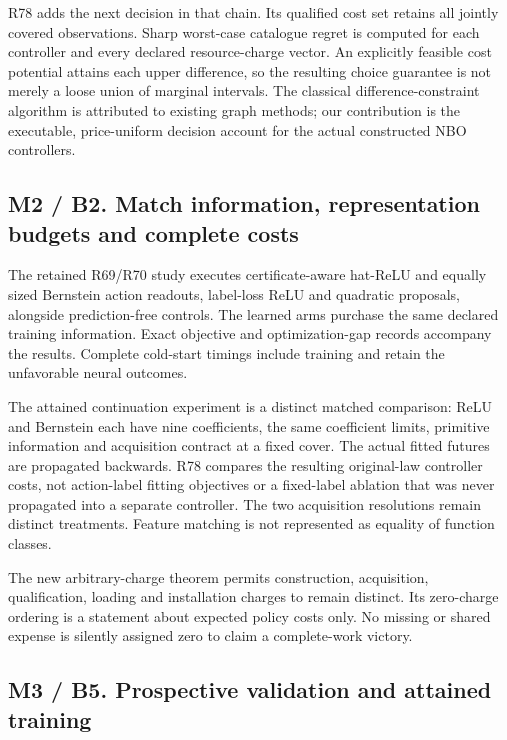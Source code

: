 \documentclass[ecta,nameyear,draft]{econsocart}
\begin{document}
R78 adds the next decision in that chain. Its qualified cost set retains
all jointly covered observations. Sharp worst-case catalogue regret is
computed for each controller and every declared resource-charge vector.
An explicitly feasible cost potential attains each upper difference, so
the resulting choice guarantee is not merely a loose union of marginal
intervals. The classical difference-constraint algorithm is attributed
to existing graph methods; our contribution is the executable,
price-uniform decision account for the actual constructed NBO
controllers.

\hypertarget{m2-b2.-match-information-representation-budgets-and-complete-costs}{%
\subsection{M2 / B2. Match information, representation budgets and
complete
costs}\label{m2-b2.-match-information-representation-budgets-and-complete-costs}}

The retained R69/R70 study executes certificate-aware hat-ReLU and
equally sized Bernstein action readouts, label-loss ReLU and quadratic
proposals, alongside prediction-free controls. The learned arms purchase
the same declared training information. Exact objective and
optimization-gap records accompany the results. Complete cold-start
timings include training and retain the unfavorable neural outcomes.

The attained continuation experiment is a distinct matched comparison:
ReLU and Bernstein each have nine coefficients, the same coefficient
limits, primitive information and acquisition contract at a fixed cover.
The actual fitted futures are propagated backwards. R78 compares the
resulting original-law controller costs, not action-label fitting
objectives or a fixed-label ablation that was never propagated into a
separate controller. The two acquisition resolutions remain distinct
treatments. Feature matching is not represented as equality of function
classes.

The new arbitrary-charge theorem permits construction, acquisition,
qualification, loading and installation charges to remain distinct. Its
zero-charge ordering is a statement about expected policy costs only. No
missing or shared expense is silently assigned zero to claim a
complete-work victory.

\hypertarget{m3-b5.-prospective-validation-and-attained-training}{%
\subsection{M3 / B5. Prospective validation and attained
training}\label{m3-b5.-prospective-validation-and-attained-training}}
\end{document}

